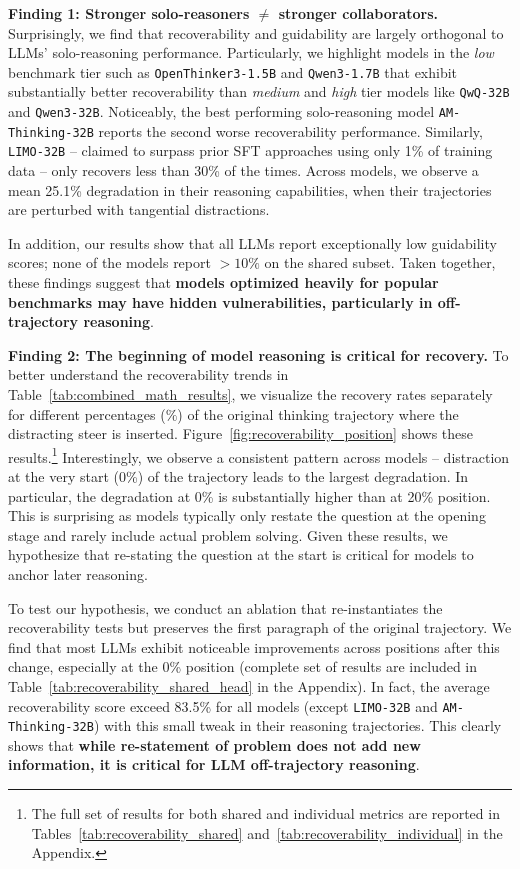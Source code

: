 \documentclass{article} %
\begin{document}
\textbf{Finding 1: Stronger solo-reasoners $\ne$ stronger collaborators.} Surprisingly, we find that recoverability and guidability are largely orthogonal to LLMs' solo-reasoning performance. Particularly, we highlight models in the \textit{low} benchmark tier such as \texttt{OpenThinker3-1.5B}  and \texttt{Qwen3-1.7B} that exhibit substantially better recoverability than \textit{medium} and \textit{high} tier models like \texttt{QwQ-32B} and \texttt{Qwen3-32B}. Noticeably, the best performing solo-reasoning model \texttt{AM-Thinking-32B} reports the second worse recoverability performance. Similarly, \texttt{LIMO-32B} -- claimed to surpass prior SFT approaches using only 1\% of training data -- only recovers less than 30\% of the times. Across models, we observe a mean 25.1\% degradation in their reasoning capabilities, when their trajectories are perturbed with tangential distractions. 

In addition, our results show that all LLMs report exceptionally low guidability scores; none of the models report $\!>\!10\%$ on the shared subset. Taken together, these findings suggest that \textbf{models optimized heavily for popular benchmarks may have hidden vulnerabilities, particularly in off-trajectory reasoning}.


\textbf{Finding 2: The beginning of model reasoning is critical for recovery.} To better understand the recoverability trends in Table~\ref{tab:combined_math_results}, 
we visualize the recovery rates separately for different percentages ($\%$) of the original thinking trajectory where the distracting steer is inserted. Figure~\ref{fig:recoverability_position} shows these results.\footnote{The full set of results for both shared and individual metrics are reported in Tables~\ref{tab:recoverability_shared} and~\ref{tab:recoverability_individual} in the Appendix.} Interestingly, we observe a consistent pattern across models -- distraction at the very start (0\%) of the trajectory leads to the largest degradation. In particular, the degradation at 0\% is substantially higher than at 20\% position. This is surprising as models typically only restate the question at the opening stage and rarely include actual problem solving. Given these results, we hypothesize that re-stating the question at the start is critical for models to anchor later reasoning.

To test our hypothesis, we conduct an ablation that re-instantiates the recoverability tests but preserves the first paragraph of the original trajectory. We find that most LLMs exhibit noticeable improvements across positions after this change, especially at the 0\% position (complete set of results are included in Table~\ref{tab:recoverability_shared_head} in the Appendix). In fact, the average recoverability score exceed 83.5\%  for all models (except \texttt{LIMO-32B} and \texttt{AM-Thinking-32B}) with this small tweak in their reasoning trajectories. This clearly shows that \textbf{while re-statement of problem does not add new information, it is critical for LLM off-trajectory reasoning}. 
\end{document}
